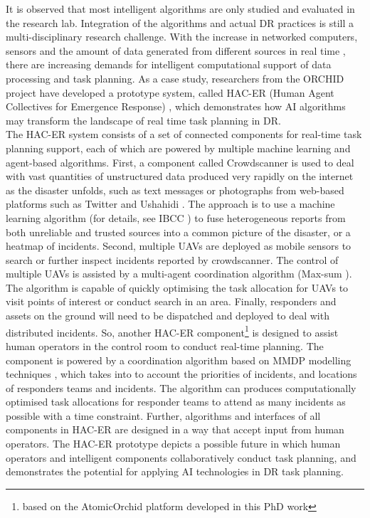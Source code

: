 It is observed that most intelligent algorithms are only studied and evaluated in the research lab. Integration of the algorithms and actual \ac{DR} practices is still a multi-disciplinary research challenge.  With the increase in networked computers, sensors and the amount of data generated from different sources in real time \citep{Ramchurn2015}, there are increasing demands for intelligent computational support of data processing and task planning. As a case study, researchers from the ORCHID project have developed a prototype system, called HAC-ER (Human Agent Collectives for Emergence Response) \citep{Jennings2014,Ramchurn2015,Ramchurn2015a}, which demonstrates how \ac{AI} algorithms may transform the landscape of real time task planning in \ac{DR}.\\

The \ac{HAC-ER} system consists of a set of connected components for real-time task planning support, each of which are powered by multiple machine learning and agent-based algorithms. First, a component called Crowdscanner is used to deal with vast quantities of unstructured data produced very rapidly on the internet as the disaster unfolds, such as text messages or photographs from web-based platforms such as Twitter and Ushahidi \citep{Morrow2011}. The approach is to use a machine learning algorithm (for details, see IBCC \citep{Simpson}) to fuse heterogeneous reports from both unreliable and trusted sources into a common picture of the disaster, or a heatmap of incidents. Second, multiple  \acf{UAV}s are deployed as mobile sensors to search or further inspect incidents reported by crowdscanner. The control of multiple \ac{UAV}s is assisted by a multi-agent coordination algorithm (Max-sum \citep{Ramchurn2010}). The algorithm is capable of quickly optimising the task allocation for \ac{UAV}s to visit points of interest or conduct search in an area.  Finally, responders and assets on the ground will need to be dispatched and deployed to deal with distributed incidents. So, another \ac{HAC-ER} component\footnote{based on the AtomicOrchid platform developed in this PhD work} is designed to assist human operators in the control room to conduct real-time planning. The component is powered by a coordination algorithm based on MMDP modelling techniques \citep{Wu2015}, which takes into to account the priorities of incidents, and locations of responders teams and incidents. The algorithm can produces computationally optimised task allocations for responder teams to attend as many incidents as possible with a time constraint. Further, algorithms and interfaces of all components in \ac{HAC-ER} are designed in a way that accept input from human operators. The \ac{HAC-ER} prototype depicts a possible future in which human operators and intelligent components collaboratively conduct task planning, and demonstrates the potential for applying \ac{AI} technologies in \ac{DR} task planning.\\

